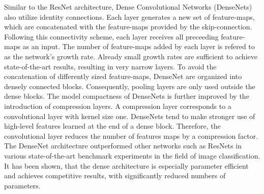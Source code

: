 Similar to the ResNet architecture, Dense Convolutional Networks (DenseNets) \cite{Huang2017} also utilize identity connections.
Each layer generates a new set of feature-maps, which are concatenated with the feature-maps provided by the skip-connection.
Following this connectivity scheme, each layer receives all preceeding feature-maps as an input.
The number of feature-maps added by each layer is refered to as the network's growth rate.
Already small growth rates are sufficient to achieve state-of-the-art results, resulting in very narrow layers.
To avoid the concatenation of differently sized feature-maps, DenseNet are organized into densely connected blocks.
Consequently, pooling layers are only used outside the dense blocks.
The model compactness of DenseNets is further improved by the introduction of compression layers.
A compression layer corresponds to a convolutional layer with kernel size one.
DenseNets tend to make stronger use of high-level features learned at the end of a dense block.
Therefore, the convolutional layer reduces the number of features maps by a compression factor.
The DenseNet architecture outperformed other networks such as ResNets in various state-of-the-art benchmark experiments in the field of image classification.
It has been shown, that the dense architecture is especially parameter efficient and achieves competitive results, with significantly reduced numbers of parameters.





